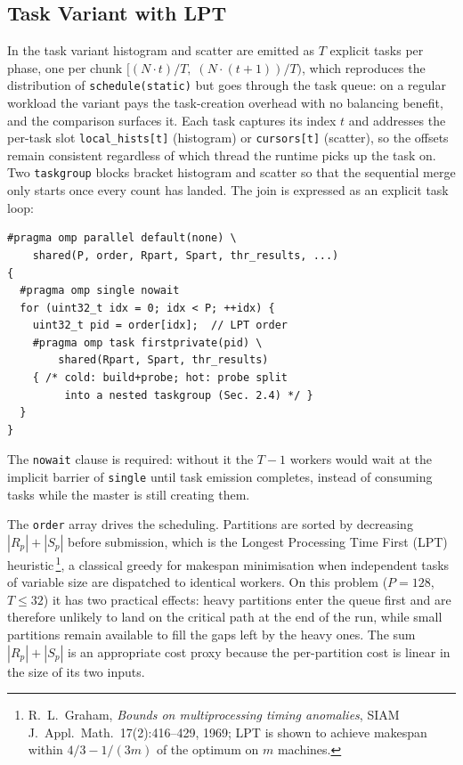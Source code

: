 \documentclass[10pt,twocolumn,a4paper]{article}
\begin{document}
\subsection{Task Variant with LPT}\label{sec:task}
In the task variant histogram and scatter are emitted as $T$
explicit tasks per phase, one per chunk
$[(N\!\cdot\!t)/T,\;(N\!\cdot\!(t{+}1))/T)$, which reproduces the
distribution of \texttt{schedule(static)} but goes through the task
queue: on a regular workload the variant pays the task-creation
overhead with no balancing benefit, and the comparison surfaces it. Each task captures its index $t$ and
addresses the per-task slot \texttt{local\_hists[t]} (histogram) or
\texttt{cursors[t]} (scatter), so the offsets remain consistent
regardless of which thread the runtime picks up the task on. Two
\texttt{taskgroup} blocks bracket histogram and scatter so that the
sequential merge only starts once every count has landed. The join
is expressed as an explicit task loop:

\small\begin{verbatim}
#pragma omp parallel default(none) \
    shared(P, order, Rpart, Spart, thr_results, ...)
{
  #pragma omp single nowait
  for (uint32_t idx = 0; idx < P; ++idx) {
    uint32_t pid = order[idx];  // LPT order
    #pragma omp task firstprivate(pid) \
        shared(Rpart, Spart, thr_results)
    { /* cold: build+probe; hot: probe split
         into a nested taskgroup (Sec. 2.4) */ }
  }
}
\end{verbatim}\normalsize

The \texttt{nowait} clause is required: without it the $T-1$ workers
would wait at the implicit barrier of \texttt{single} until task
emission completes, instead of consuming tasks while the master is
still creating them.

The \texttt{order} array drives the scheduling. Partitions are sorted
by decreasing $|R_p| + |S_p|$ before submission, which is the Longest
Processing Time First (LPT) heuristic\,\footnote{R.~L.~Graham,
\emph{Bounds on multiprocessing timing anomalies}, SIAM
J.~Appl.~Math.\ 17(2):416--429, 1969; LPT is shown to achieve
makespan within $4/3 - 1/(3m)$ of the optimum on $m$ machines.},
a classical greedy for makespan minimisation when
independent tasks of variable size are dispatched to identical
workers. On this problem ($P{=}128$,
$T\!\le\!32$) it has two practical effects: heavy partitions enter
the queue first and are therefore unlikely to land on the critical
path at the end of the run, while small partitions remain available
to fill the gaps left by the heavy ones. The sum $|R_p|+|S_p|$ is an
appropriate cost proxy because the per-partition cost is linear in
the size of its two inputs.
\end{document}
